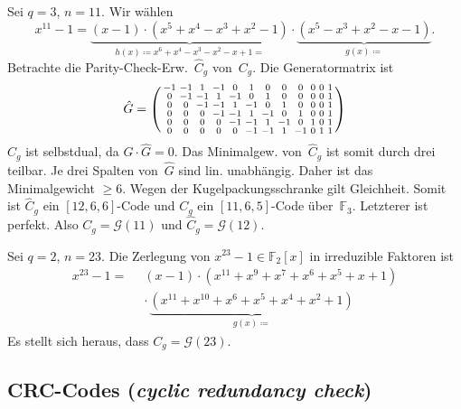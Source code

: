\documentclass{cheat-sheet}
\newcommand{\F}{\mathbb{F}} %
\newcommand{\Golay}{\mathcal{G}} %
\begin{document}
\begin{bsp}
  Sei $q = 3$, $n = 11$.
  Wir wählen
  \[
    x^{11} - 1 = \underbrace{(x-1) \cdot (x^5 + x^4 - x^3 + x^2 - 1)}_{h(x) \coloneqq x^6 + x^4 - x^3 - x^2 - x + 1 =} \cdot \underbrace{(x^5 - x^3 + x^2 - x - 1)}_{g(x) \coloneqq}.
  \]
  Betrachte die Parity-Check-Erw.~$\hat{C}_g$ von~$C_g$.
  Die Generatormatrix ist
  \[
    \setcounter{MaxMatrixCols}{20} %
    \hat{G} = \begin{psmallmatrix}
      -1 & -1 & 1 & -1 & 0 & 1 & 0 & 0 & 0 & 0 & 0 & 1 \\
      0 & -1 & -1 & 1 & -1 & 0 & 1 & 0 & 0 & 0 & 0 & 1 \\
      0 & 0 & -1 & -1 & 1 & -1 & 0 & 1 & 0 & 0 & 0 & 1 \\
      0 & 0 & 0 & -1 & -1 & 1 & -1 & 0 & 1 & 0 & 0 & 1 \\
      0 & 0 & 0 & 0 & -1 & -1 & 1 & -1 & 0 & 1 & 0 & 1 \\
      0 & 0 & 0 & 0 & 0 & -1 & -1 & 1 & -1 & 0 & 1 & 1
    \end{psmallmatrix}
  \]
  $\hat{C}_g$ ist selbstdual, da $\hat{G} \cdot \hat{G} = 0$.
  Das Minimalgew. von~$\hat{C}_g$ ist somit durch drei teilbar.
  Je drei Spalten von~$\hat{G}$ sind lin. unabhängig.
  Daher ist das Minimalgewicht $\geq 6$.
  Wegen der Kugelpackungsschranke gilt Gleichheit.
  Somit ist $\hat{C}_g$ ein $[12, 6, 6]$-Code und $C_g$ ein $[11, 6, 5]$-Code über~$\F_3$.
  Letzterer ist perfekt.
  Also $C_g = \Golay(11)$ und $\hat{C}_g = \Golay(12)$.
\end{bsp}

\begin{bsp}
  Sei $q = 2$, $n = 23$.
  Die Zerlegung von $x^{23} - 1 \in \F_2[x]$ in irreduzible Faktoren ist
  \begin{align*}
    x^{23} - 1 = \enspace & (x-1) \cdot (x^{11} + x^9 + x^7 + x^6 + x^5 + x + 1) \\
    & \cdot \, \underbrace{(x^{11} + x^{10} + x^6 + x^5 + x^4 + x^2 + 1)}_{g(x) \coloneqq}
  \end{align*}
  Es stellt sich heraus, dass $C_g = \Golay(23)$.
\end{bsp}

\subsection{CRC-Codes (\textit{cyclic redundancy check})}
\end{document}
